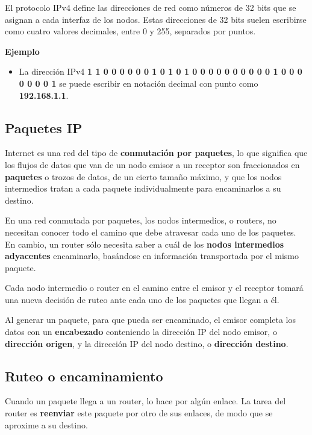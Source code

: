 \documentclass[spanish,A4,]{article}
\begin{document}
El protocolo IPv4 define las direcciones de red como números de 32 bits
que se asignan a cada interfaz de los nodos. Estas direcciones de 32
bits suelen escribirse como cuatro valores decimales, entre 0 y 255,
separados por puntos.

\textbf{Ejemplo}

\begin{itemize}
\itemsep1pt\parskip0pt
\item
  La dirección IPv4 \textbf{1 1 0 0 0 0 0 0 1 0 1 0 1 0 0 0 0 0 0 0 0 0 0 1 0 0 0 0 0 0 0 1} se puede
  escribir en notación decimal con punto como \textbf{192.168.1.1}.
\end{itemize}

\subsection{Paquetes IP}\label{paquetes-ip}

Internet es una red del tipo de \textbf{conmutación por paquetes}, lo
que significa que los flujos de datos que van de un nodo emisor a un
receptor son fraccionados en \textbf{paquetes} o trozos de datos, de un
cierto tamaño máximo, y que los nodos intermedios tratan a cada paquete
individualmente para encaminarlos a su destino.

En una red conmutada por paquetes, los nodos intermedios, o routers, no
necesitan conocer todo el camino que debe atravesar cada uno de los
paquetes. En cambio, un router sólo necesita saber a cuál de los
\textbf{nodos intermedios adyacentes} encaminarlo, basándose en
información transportada por el mismo paquete.

Cada nodo intermedio o router en el camino entre el emisor y el receptor
tomará una nueva decisión de ruteo ante cada uno de los paquetes que
llegan a él.

Al generar un paquete, para que pueda ser encaminado, el emisor completa
los datos con un \textbf{encabezado} conteniendo la dirección IP del
nodo emisor, o \textbf{dirección origen}, y la dirección IP del nodo
destino, o \textbf{dirección destino}.

\subsection{Ruteo o encaminamiento}\label{ruteo-o-encaminamiento}

Cuando un paquete llega a un router, lo hace por algún enlace. La tarea
del router es \textbf{reenviar} este paquete por otro de sus enlaces, de
modo que se aproxime a su destino.
\end{document}
